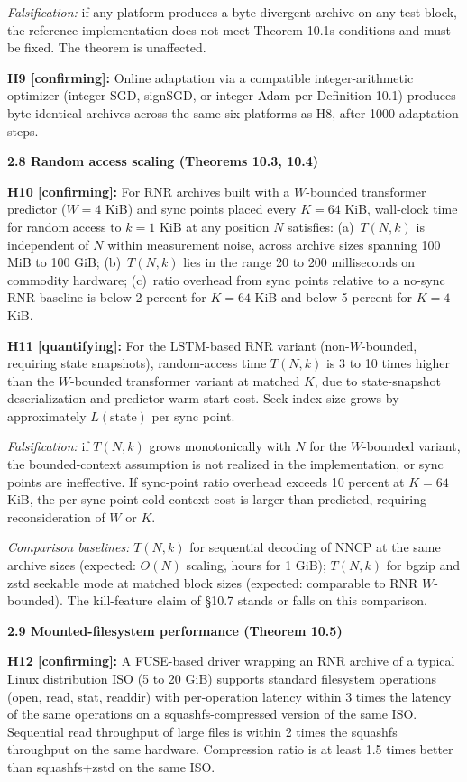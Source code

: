 \documentclass[
]{article}
\begin{document}
\emph{Falsification:} if any platform produces a byte-divergent archive
on any test block, the reference implementation does not meet Theorem
10.1\textquotesingle s conditions and must be fixed. The theorem is
unaffected.

\textbf{H9 {[}confirming{]}:} Online adaptation via a compatible
integer-arithmetic optimizer (integer SGD, signSGD, or integer Adam per
Definition 10.1) produces byte-identical archives across the same six
platforms as H8, after 1000 adaptation steps.

\textbf{2.8 Random access scaling (Theorems 10.3, 10.4)}

\textbf{H10 {[}confirming{]}:} For RNR archives built with a
$W$-bounded transformer predictor ($W = 4$ KiB) and sync points
placed every $K = 64$ KiB, wall-clock time for random access to
$k = 1$ KiB at any position $N$ satisfies: (a)~$T(N, k)$ is
independent of $N$ within measurement noise, across archive sizes
spanning 100 MiB to 100 GiB; (b)~$T(N, k)$ lies in the range 20 to
200 milliseconds on commodity hardware; (c)~ratio overhead from
sync points relative to a no-sync RNR baseline is below 2 percent
for $K = 64$ KiB and below 5 percent for $K = 4$ KiB.

\textbf{H11 {[}quantifying{]}:} For the LSTM-based RNR variant
(non-$W$-bounded, requiring state snapshots), random-access time
$T(N, k)$ is 3 to 10 times higher than the $W$-bounded transformer
variant at matched $K$, due to state-snapshot deserialization and
predictor warm-start cost. Seek index size grows by approximately
$L(\text{state})$ per sync point.

\emph{Falsification:} if $T(N, k)$ grows monotonically with $N$ for
the $W$-bounded variant, the bounded-context assumption is not
realized in the implementation, or sync points are ineffective. If
sync-point ratio overhead exceeds 10 percent at $K = 64$ KiB, the
per-sync-point cold-context cost is larger than predicted,
requiring reconsideration of $W$ or $K$.

\emph{Comparison baselines:} $T(N, k)$ for sequential decoding of
NNCP at the same archive sizes (expected: $O(N)$ scaling, hours for
1 GiB); $T(N, k)$ for bgzip and zstd seekable mode at matched
block sizes (expected: comparable to RNR $W$-bounded). The
kill-feature claim of §10.7 stands or falls on this comparison.

\textbf{2.9 Mounted-filesystem performance (Theorem 10.5)}

\textbf{H12 {[}confirming{]}:} A FUSE-based driver wrapping an RNR
archive of a typical Linux distribution ISO (5 to 20 GiB) supports
standard filesystem operations (open, read, stat, readdir) with
per-operation latency within 3 times the latency of the same operations
on a squashfs-compressed version of the same ISO. Sequential read
throughput of large files is within 2 times the squashfs throughput on
the same hardware. Compression ratio is at least 1.5 times better than
squashfs+zstd on the same ISO.
\end{document}
